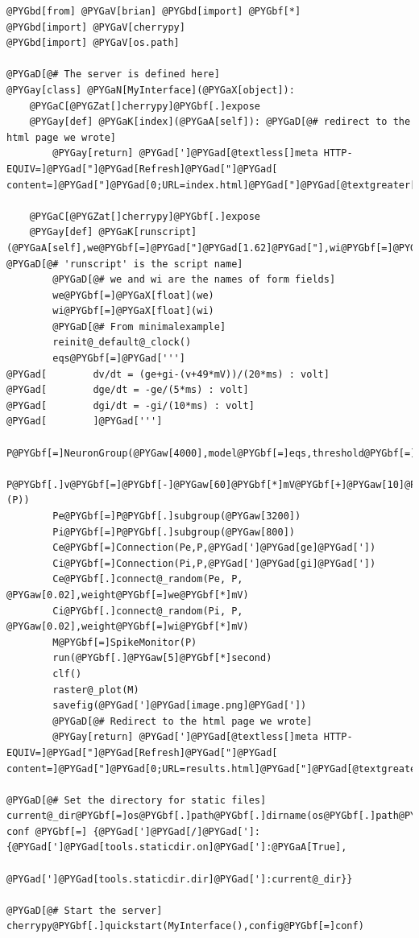 \documentclass[letterpaper,10pt,english]{manual}
\begin{document}
\begin{Verbatim}[commandchars=@\[\]]
@PYGbd[from] @PYGaV[brian] @PYGbd[import] @PYGbf[*]
@PYGbd[import] @PYGaV[cherrypy]
@PYGbd[import] @PYGaV[os.path]

@PYGaD[@# The server is defined here]
@PYGay[class] @PYGaN[MyInterface](@PYGaX[object]):
    @PYGaC[@PYGZat[]cherrypy]@PYGbf[.]expose
    @PYGay[def] @PYGaK[index](@PYGaA[self]): @PYGaD[@# redirect to the html page we wrote]
        @PYGay[return] @PYGad[']@PYGad[@textless[]meta HTTP-EQUIV=]@PYGad["]@PYGad[Refresh]@PYGad["]@PYGad[ content=]@PYGad["]@PYGad[0;URL=index.html]@PYGad["]@PYGad[@textgreater[]]@PYGad[']

    @PYGaC[@PYGZat[]cherrypy]@PYGbf[.]expose
    @PYGay[def] @PYGaK[runscript](@PYGaA[self],we@PYGbf[=]@PYGad["]@PYGad[1.62]@PYGad["],wi@PYGbf[=]@PYGad["]@PYGad[-9]@PYGad["],@PYGbf[*]@PYGbf[*]kwd): @PYGaD[@# 'runscript' is the script name]
        @PYGaD[@# we and wi are the names of form fields]
        we@PYGbf[=]@PYGaX[float](we)
        wi@PYGbf[=]@PYGaX[float](wi)
        @PYGaD[@# From minimalexample]
        reinit@_default@_clock()
        eqs@PYGbf[=]@PYGad[''']
@PYGad[        dv/dt = (ge+gi-(v+49*mV))/(20*ms) : volt]
@PYGad[        dge/dt = -ge/(5*ms) : volt]
@PYGad[        dgi/dt = -gi/(10*ms) : volt]
@PYGad[        ]@PYGad[''']
        P@PYGbf[=]NeuronGroup(@PYGaw[4000],model@PYGbf[=]eqs,threshold@PYGbf[=]@PYGbf[-]@PYGaw[50]@PYGbf[*]mV,reset@PYGbf[=]@PYGbf[-]@PYGaw[60]@PYGbf[*]mV)
        P@PYGbf[.]v@PYGbf[=]@PYGbf[-]@PYGaw[60]@PYGbf[*]mV@PYGbf[+]@PYGaw[10]@PYGbf[*]mV@PYGbf[*]rand(@PYGaX[len](P))
        Pe@PYGbf[=]P@PYGbf[.]subgroup(@PYGaw[3200])
        Pi@PYGbf[=]P@PYGbf[.]subgroup(@PYGaw[800])
        Ce@PYGbf[=]Connection(Pe,P,@PYGad[']@PYGad[ge]@PYGad['])
        Ci@PYGbf[=]Connection(Pi,P,@PYGad[']@PYGad[gi]@PYGad['])
        Ce@PYGbf[.]connect@_random(Pe, P, @PYGaw[0.02],weight@PYGbf[=]we@PYGbf[*]mV)
        Ci@PYGbf[.]connect@_random(Pi, P, @PYGaw[0.02],weight@PYGbf[=]wi@PYGbf[*]mV)
        M@PYGbf[=]SpikeMonitor(P)
        run(@PYGbf[.]@PYGaw[5]@PYGbf[*]second)
        clf()
        raster@_plot(M)
        savefig(@PYGad[']@PYGad[image.png]@PYGad['])
        @PYGaD[@# Redirect to the html page we wrote]
        @PYGay[return] @PYGad[']@PYGad[@textless[]meta HTTP-EQUIV=]@PYGad["]@PYGad[Refresh]@PYGad["]@PYGad[ content=]@PYGad["]@PYGad[0;URL=results.html]@PYGad["]@PYGad[@textgreater[]]@PYGad[']

@PYGaD[@# Set the directory for static files]
current@_dir@PYGbf[=]os@PYGbf[.]path@PYGbf[.]dirname(os@PYGbf[.]path@PYGbf[.]abspath(@_@_file@_@_))
conf @PYGbf[=] {@PYGad[']@PYGad[/]@PYGad[']: {@PYGad[']@PYGad[tools.staticdir.on]@PYGad[']:@PYGaA[True],
              @PYGad[']@PYGad[tools.staticdir.dir]@PYGad[']:current@_dir}}

@PYGaD[@# Start the server]
cherrypy@PYGbf[.]quickstart(MyInterface(),config@PYGbf[=]conf)
\end{Verbatim}
\end{document}
